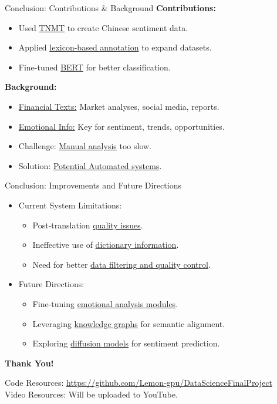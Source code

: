 \documentclass[aspectratio=169]{beamer}
\begin{document}
\begin{frame}{Conclusion: Contributions \& Background}
  \textbf{Contributions:}
  \begin{itemize}
      \item Used \underline{TNMT} to create Chinese sentiment data.
      \item Applied \underline{lexicon-based annotation} to expand datasets.
      \item Fine-tuned \underline{BERT} for better classification.
  \end{itemize}
  \textbf{Background:}
  \begin{itemize}
      \item \underline{Financial Texts:} Market analyses, social media, reports.
      \item \underline{Emotional Info:} Key for sentiment, trends, opportunities.
      \item Challenge: \underline{Manual analysis} too slow.
      \item Solution: \underline{Potential Automated systems}.
  \end{itemize}
  \end{frame}
  

\begin{frame}{Conclusion: Improvements and Future Directions}
  \begin{itemize}
      \item Current System Limitations:
      \begin{itemize}
          \item Post-translation \underline{quality issues}.
          \item Ineffective use of \underline{dictionary information}.
          \item Need for better \underline{data filtering and quality control}.
      \end{itemize}
      \item Future Directions:
      \begin{itemize}
          \item Fine-tuning \underline{emotional analysis modules}.
          \item Leveraging \underline{knowledge graphs} for semantic alignment.
          \item Exploring \underline{diffusion models} for sentiment prediction.
      \end{itemize}
  \end{itemize}

  \begin{center}
    \textbf{Thank You!}
  \end{center}

  Code Resources: \url{https://github.com/Lemon-gpu/DataScienceFinalProject} \\
  Video Resources: Will be uploaded to YouTube.
\end{frame}
\end{document}
